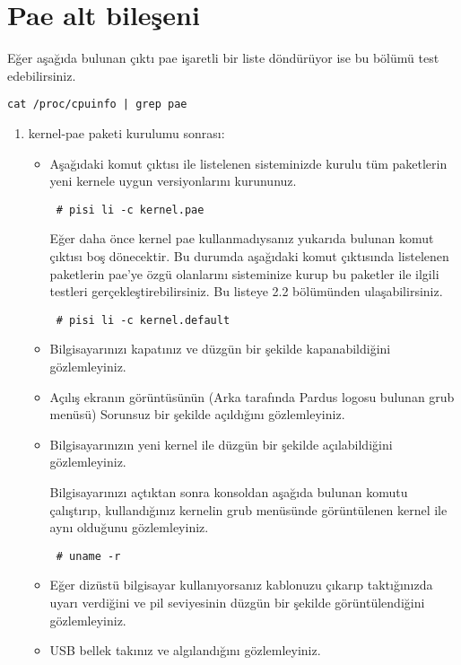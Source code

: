 \documentclass[a4paper,10pt]{article}
\begin{document}
\section{Pae alt bileşeni}

Eğer aşağıda bulunan çıktı pae işaretli bir liste döndürüyor ise bu bölümü test edebilirsiniz.
\begin{verbatim}
cat /proc/cpuinfo | grep pae 
\end{verbatim}

\begin{enumerate}

 \item kernel-pae paketi kurulumu sonrası:

\begin{itemize}
\item
Aşağıdaki komut çıktısı ile listelenen sisteminizde kurulu tüm paketlerin yeni kernele uygun versiyonlarını kurununuz.
\begin{verbatim}
 # pisi li -c kernel.pae
\end{verbatim}

Eğer daha önce kernel pae kullanmadıysanız yukarıda bulunan komut çıktısı boş dönecektir. Bu durumda aşağıdaki komut çıktısında listelenen paketlerin pae'ye özgü olanlarını sisteminize kurup bu paketler ile ilgili testleri gerçekleştirebilirsiniz. Bu listeye 2.2 bölümünden ulaşabilirsiniz.

\begin{verbatim}
 # pisi li -c kernel.default
\end{verbatim}


\item Bilgisayarınızı kapatınız ve düzgün bir şekilde kapanabildiğini gözlemleyiniz.
\item Açılış ekranın görüntüsünün (Arka tarafında Pardus logosu bulunan grub menüsü) Sorunsuz bir şekilde açıldığını gözlemleyiniz.
\item Bilgisayarınızın yeni kernel ile düzgün bir şekilde açılabildiğini gözlemleyiniz.

Bilgisayarınızı açtıktan sonra konsoldan aşağıda bulunan komutu çalıştırıp, kullandığınız kernelin grub menüsünde görüntülenen kernel ile aynı olduğunu gözlemleyiniz.
\begin{verbatim}
 # uname -r 
\end{verbatim}

\item Eğer dizüstü bilgisayar kullanıyorsanız kablonuzu çıkarıp taktığınızda uyarı verdiğini ve pil seviyesinin düzgün bir şekilde görüntülendiğini gözlemleyiniz.
\item USB bellek takınız ve algılandığını gözlemleyiniz.
\end{itemize}


\end{enumerate}
\end{document}
